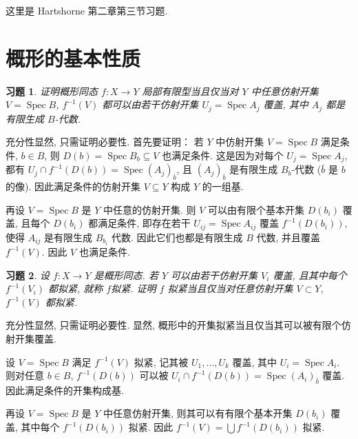 \documentclass{article}
\theoremstyle{exercise}
\newtheorem{exercise}{习题}[section]
\newenvironment{proofc}{\proof}{\endproof}
\def\Spec{\operatorname{Spec}}
\begin{document}
这里是 Hartshorne 第二章第三节习题.

\setcounter{section}{2}

\section{概形的基本性质}

\begin{exercise}
  证明概形同态 $f \colon X \to Y$ 局部有限型当且仅当对 $Y$ 中\emph{任意}仿射开集 $V = \Spec B$,
  $f^{-1}(V)$ 都可以由若干仿射开集 $U_j = \Spec A_j$ 覆盖, 其中 $A_j$ 都是有限生成 $B$-代数.
\end{exercise}

\begin{proofc}
  充分性显然, 只需证明必要性.
  首先要证明：
  若 $Y$ 中仿射开集 $V = \Spec B$ 满足条件, $b \in B$,
  则 $D(b) = \Spec B_b \subseteq V$ 也满足条件.
  这是因为对每个 $U_j = \Spec A_j$, 都有 $U_j \cap f^{-1}(D(b)) = \Spec (A_j)_{\bar{b}}$,
  且 $(A_j)_{\bar{b}}$ 是有限生成 $B_b$-代数 ($\bar{b}$ 是 $b$ 的像).
  因此满足条件的仿射开集 $V \subseteq Y$ 构成 $Y$ 的一组基.

  再设 $V = \Spec B$ 是 $Y$ 中任意的仿射开集.
  则 $V$ 可以由有限个基本开集 $D(b_i)$ 覆盖, 且每个 $D(b_i)$ 都满足条件,
  即存在若干 $U_{ij} = \Spec A_{ij}$ 覆盖 $f^{-1}(D(b_i))$,
  使得 $A_{ij}$ 是有限生成 $B_{b_i}$ 代数.
  因此它们也都是有限生成 $B$ 代数, 并且覆盖 $f^{-1}(V)$. 因此 $V$ 也满足条件.
\end{proofc}

\begin{exercise}
  设 $f \colon X \to Y$ 是概形同态. 若 $Y$ 可以由若干仿射开集 $V_i$ 覆盖,
  且其中每个 $f^{-1}(V_i)$ 都拟紧, 就称 $f$\emph{拟紧}.
  证明 $f$ 拟紧当且仅当对\emph{任意}仿射开集 $V \subset Y$, $f^{-1} (V)$ 都拟紧.
\end{exercise}

\begin{proofc}
  充分性显然, 只需证明必要性.
  显然, 概形中的开集拟紧当且仅当其可以被有限个仿射开集覆盖.

  设 $V = \Spec B$ 满足 $f^{-1}(V)$ 拟紧, 记其被 $U_1, \dots, U_k$ 覆盖,
  其中 $U_i = \Spec A_i$. 则对任意 $b \in B$,
  $f^{-1}(D(b))$ 可以被 $U_i \cap f^{-1}(D(b)) = \Spec (A_i)_{\bar{b}}$ 覆盖.
  因此满足条件的开集构成基.

  再设 $V = \Spec B$ 是 $Y$ 中任意仿射开集, 则其可以有有限个基本开集 $D(b_i)$ 覆盖,
  其中每个 $f^{-1}(D(b_i))$ 拟紧. 因此 $f^{-1}(V) = \bigcup f^{-1}(D(b_i))$ 拟紧.
\end{proofc}
\end{document}
